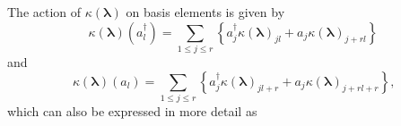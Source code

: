 \documentclass[aps, preprint]{revtex4}
\begin{document}
The action of $\kappa  \left (\mathbf{\lambda }\right )$ on basis elements is given by
\begin{equation}\kappa  \left (\mathbf{\lambda }\right ) \left (a_{l}^{ \dag }\right ) =\sum _{1 \leq j \leq r}\left \{a_{j}^{ \dag } \kappa  \left (\mathbf{\lambda }\right )_{j l} +a_{j} \kappa  \left (\mathbf{\lambda }\right )_{j +r l}\right \}
\end{equation}and
\begin{equation}\kappa  \left (\mathbf{\lambda }\right ) \left (a_{l}\right ) =\sum _{1 \leq j \leq r}\left \{a_{j}^{ \dag } \kappa  \left (\mathbf{\lambda }\right )_{j l +r} +a_{j} \kappa  \left (\mathbf{\lambda }\right )_{j +r l +r}\right \}\text{,}
\end{equation}which can also be expressed in more detail as 
\end{document}

